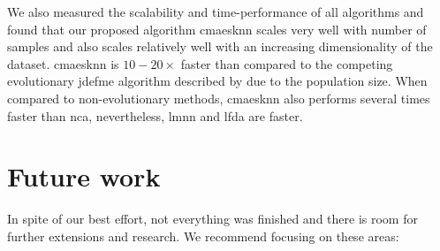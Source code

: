 \documentclass[12pt,a4paper]{report}
\begin{document}
We also measured the scalability and time-performance of all algorithms and found that our proposed algorithm \ac{cmaesknn} scales very well with number of samples and also scales relatively well with an increasing dimensionality of the dataset. \ac{cmaesknn} is $10-20\times$ faster than compared to the competing evolutionary \ac{jdefme} algorithm described by \citep{fukui2013evolutionary} due to the population size. When compared to non-evolutionary methods, \ac{cmaesknn} also performs several times faster than \ac{nca}, nevertheless, \ac{lmnn} and \ac{lfda} are faster.


\chapter*{Future work} \label{chap:future-work}


In spite of our best effort, not everything was finished and there is room for further extensions and research. We recommend focusing on these areas:
\end{document}
